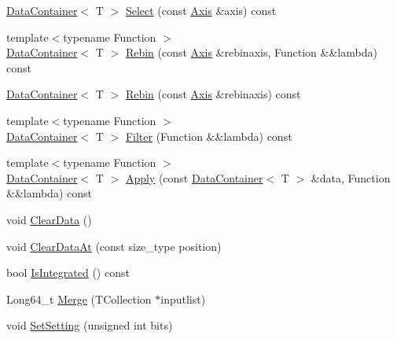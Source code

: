 \begin{DoxyCompactItemize}
\mbox{\hyperlink{classQn_1_1DataContainer}{Data\+Container}}$<$ T $>$ \mbox{\hyperlink{classQn_1_1DataContainer_a6f6590866c0cfe451cf966292d3eb69a}{Select}} (const \mbox{\hyperlink{classQn_1_1Axis}{Axis}} \&axis) const
\item 
{\footnotesize template$<$typename Function $>$ }\\\mbox{\hyperlink{classQn_1_1DataContainer}{Data\+Container}}$<$ T $>$ \mbox{\hyperlink{classQn_1_1DataContainer_aeac968c52250853cca2fd0ed2978c8e4}{Rebin}} (const \mbox{\hyperlink{classQn_1_1Axis}{Axis}} \&rebinaxis, Function \&\&lambda) const
\item 
\mbox{\hyperlink{classQn_1_1DataContainer}{Data\+Container}}$<$ T $>$ \mbox{\hyperlink{classQn_1_1DataContainer_a775225cf7b6e9bd66c7571531013c07d}{Rebin}} (const \mbox{\hyperlink{classQn_1_1Axis}{Axis}} \&rebinaxis) const
\item 
{\footnotesize template$<$typename Function $>$ }\\\mbox{\hyperlink{classQn_1_1DataContainer}{Data\+Container}}$<$ T $>$ \mbox{\hyperlink{classQn_1_1DataContainer_a2c165924fca1953fd09f2a7aabdb608c}{Filter}} (Function \&\&lambda) const
\item 
{\footnotesize template$<$typename Function $>$ }\\\mbox{\hyperlink{classQn_1_1DataContainer}{Data\+Container}}$<$ T $>$ \mbox{\hyperlink{classQn_1_1DataContainer_afe0598569174690569116e5120234b7d}{Apply}} (const \mbox{\hyperlink{classQn_1_1DataContainer}{Data\+Container}}$<$ T $>$ \&data, Function \&\&lambda) const
\item 
void \mbox{\hyperlink{classQn_1_1DataContainer_acd8c7e0e00f681929bf29f35830ff232}{Clear\+Data}} ()
\item 
void \mbox{\hyperlink{classQn_1_1DataContainer_a60a01024cc3b7c421ff1270608975ee7}{Clear\+Data\+At}} (const size\+\_\+type position)
\item 
bool \mbox{\hyperlink{classQn_1_1DataContainer_a5cb38267726d0c1e2196f51d066e306f}{Is\+Integrated}} () const
\item 
Long64\+\_\+t \mbox{\hyperlink{classQn_1_1DataContainer_a7bc5a8330ed6a0a1964fc27af7fd6775}{Merge}} (T\+Collection $\ast$inputlist)
\item 
void \mbox{\hyperlink{classQn_1_1DataContainer_a655e42708d02b905b28cba7fb4f0dd42}{Set\+Setting}} (unsigned int bits)
\item 
\mbox{\label{classQn_1_1DataContainer_a18f35066b8d8519b827256ddd6971921}} 

\end{DoxyCompactItemize}
